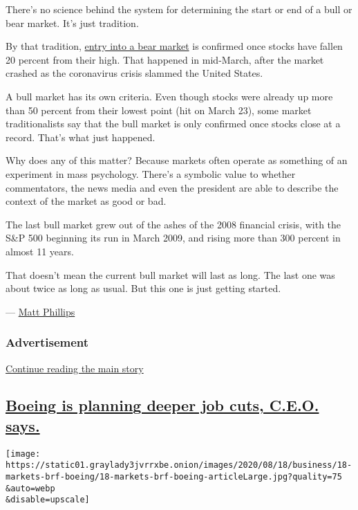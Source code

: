There's no science behind the system for determining the start or end of
a bull or bear market. It's just tradition.

By that tradition,
\href{https://www.nytimes3xbfgragh.onion/2020/03/11/business/bear-market-stocks-dow.html}{entry
into a bear market} is confirmed once stocks have fallen 20 percent from
their high. That happened in mid-March, after the market crashed as the
coronavirus crisis slammed the United States.

A bull market has its own criteria. Even though stocks were already up
more than 50 percent from their lowest point (hit on March 23), some
market traditionalists say that the bull market is only confirmed once
stocks close at a record. That's what just happened.

Why does any of this matter? Because markets often operate as something
of an experiment in mass psychology. There's a symbolic value to whether
commentators, the news media and even the president are able to describe
the context of the market as good or bad.

The last bull market grew out of the ashes of the 2008 financial crisis,
with the S\&P 500 beginning its run in March 2009, and rising more than
300 percent in almost 11 years.

That doesn't mean the current bull market will last as long. The last
one was about twice as long as usual. But this one is just getting
started.

--- \href{https://www.nytimes3xbfgragh.onion/by/matt-phillips}{Matt
Phillips}

\hypertarget{advertisement}{%
\subsubsection{Advertisement}\label{advertisement}}

\protect\hyperlink{after-dfp-ad-mid1}{Continue reading the main story}

\hypertarget{boeing-is-planning-deeper-job-cuts-ceo-says}{%
\subsection{\texorpdfstring{\protect\hyperlink{boeing-is-planning-deeper-job-cuts-ceo-says}{Boeing
is planning deeper job cuts, C.E.O.
says.}}{Boeing is planning deeper job cuts, C.E.O. says.}}\label{boeing-is-planning-deeper-job-cuts-ceo-says}}

\texttt{[image: https://static01.graylady3jvrrxbe.onion/images/2020/08/18/business/18-markets-brf-boeing/18-markets-brf-boeing-articleLarge.jpg?quality=75\\\&auto=webp\\\&disable=upscale]}

